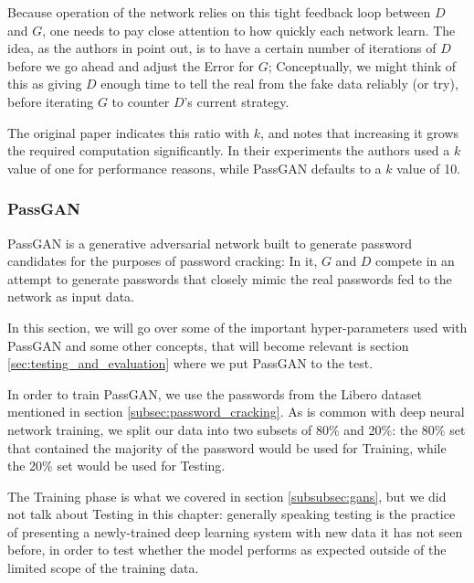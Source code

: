 Because operation of the network relies on this tight feedback loop between $D$ and $G$, one needs to pay close attention to how quickly each network learn.
The idea, as the authors in \cite{Goodfellow2014} point out, is to have a certain number of iterations of $D$ before we go ahead and adjust the Error for $G$; Conceptually, we might think of this as giving $D$ enough time to tell the real from the fake data reliably (or try), before iterating $G$ to counter $D$'s current strategy.

The original paper indicates this ratio with $k$, and notes that increasing it grows the required computation significantly. In their experiments the authors used a $k$ value of one for performance reasons, while PassGAN defaults to a $k$ value of 10\cite{PassGAN}.

\subsubsection{PassGAN}\label{subsubsec:gans-passgan}
PassGAN is a generative adversarial network built to generate password candidates for the purposes of password cracking: In it, $G$ and $D$ compete in an attempt to generate passwords that closely mimic the real passwords fed to the network as input data.

In this section, we will go over some of the important hyper-parameters used with PassGAN and some other concepts, that will become relevant is section \ref{sec:testing_and_evaluation} where we put PassGAN to the test.

In order to train PassGAN, we use the passwords from the Libero dataset mentioned in section \ref{subsec:password_cracking}. As is common with deep neural network training, we split our data into two subsets of 80\% and 20\%: the 80\% set that contained the majority of the password would be used for Training, while the 20\% set would be used for Testing. 

 The Training phase is what we covered in section \ref{subsubsec:gans}, but we did not talk about Testing in this chapter: generally speaking testing is the practice of presenting a newly-trained deep learning system with new data it has not seen before, in order to test whether the model performs as expected outside of the limited scope of the training data.

